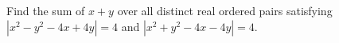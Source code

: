 Find the sum of $x+y$ over all distinct real ordered pairs satisfying $|x^2-y^2-4x+4y|=4$ and $|x^2+y^2-4x-4y|=4$.
